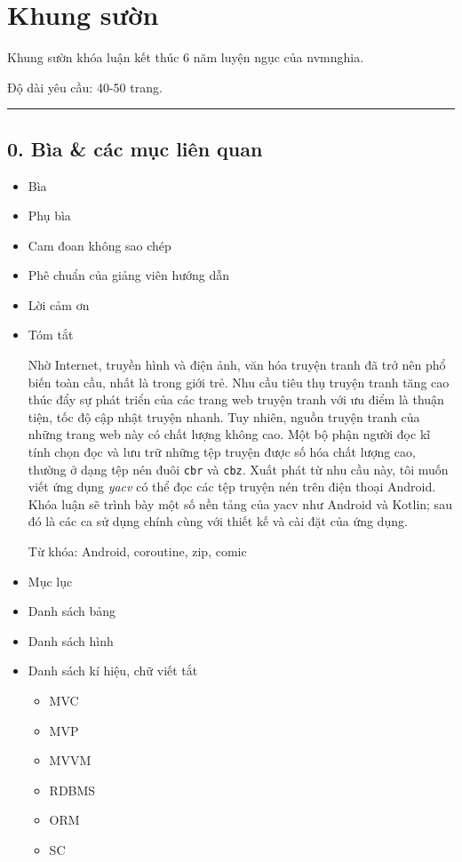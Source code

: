 \documentclass[
]{article}
\author{}
\date{}
\providecommand{\tightlist}{%
  \setlength{\itemsep}{0pt}\setlength{\parskip}{0pt}}
\begin{document}
\hypertarget{khung-sux1b0ux1eddn}{%
\section{Khung sườn}\label{khung-sux1b0ux1eddn}}

Khung sườn khóa luận kết thúc 6 năm luyện ngục của nvmnghia.

Độ dài yêu cầu: 40-50 trang.

\begin{center}\rule{0.5\linewidth}{0.5pt}\end{center}

\hypertarget{buxeca-cuxe1c-mux1ee5c-liuxean-quan}{%
\subsection{0. Bìa \& các mục liên
quan}\label{buxeca-cuxe1c-mux1ee5c-liuxean-quan}}

\begin{itemize}
\item
  Bìa
\item
  Phụ bìa
\item
  Cam đoan không sao chép
\item
  Phê chuẩn của giảng viên hướng dẫn
\item
  Lời cảm ơn
\item
  Tóm tắt

  Nhờ Internet, truyền hình và điện ảnh, văn hóa truyện tranh đã trở nên
  phổ biến toàn cầu, nhất là trong giới trẻ. Nhu cầu tiêu thụ truyện
  tranh tăng cao thúc đẩy sự phát triển của các trang web truyện tranh
  với ưu điểm là thuận tiện, tốc độ cập nhật truyện nhanh. Tuy nhiên,
  nguồn truyện tranh của những trang web này có chất lượng không cao.
  Một bộ phận người đọc kĩ tính chọn đọc và lưu trữ những tệp truyện
  được số hóa chất lượng cao, thường ở dạng tệp nén đuôi \texttt{cbr} và
  \texttt{cbz}. Xuất phát từ nhu cầu này, tôi muốn viết ứng dụng
  \emph{yacv} có thể đọc các tệp truyện nén trên điện thoại Android.
  Khóa luận sẽ trình bày một số nền tảng của yacv như Android và Kotlin;
  sau đó là các ca sử dụng chính cùng với thiết kế và cài đặt của ứng
  dụng.

  Từ khóa: Android, coroutine, zip, comic
\item
  Mục lục
\item
  Danh sách bảng
\item
  Danh sách hình
\item
  Danh sách kí hiệu, chữ viết tắt

  \begin{itemize}
  \tightlist
  \item
    MVC
  \item
    MVP
  \item
    MVVM
  \item
    RDBMS
  \item
    ORM
  \item
    SC
  \end{itemize}
\end{itemize}
\end{document}
